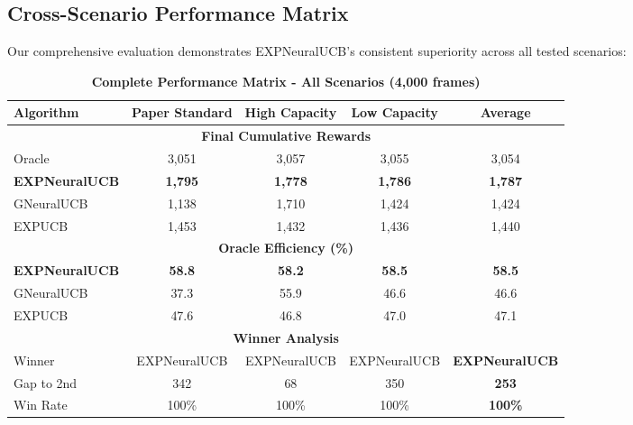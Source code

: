 \documentclass[11pt,a4paper]{article}
\newcommand{\performance}[1]{\textcolor{performancecolor}{\textbf{#1}}}
\newcommand{\success}[1]{\textcolor{successcolor}{\textbf{#1}}}
\begin{document}
\begin{tcolorbox}[colback=performancecolor!10,colframe=performancecolor,title=\textbf{Primary Performance Analysis}]

\subsection{Cross-Scenario Performance Matrix}

Our comprehensive evaluation demonstrates EXPNeuralUCB's consistent superiority across all tested scenarios:

\begin{table}[H]
\centering
\caption{\performance{Complete Performance Matrix - All Scenarios (4,000 frames)}}
\begin{tabular}{|l|c|c|c|c|}
\hline
\textbf{Algorithm} & \textbf{Paper Standard} & \textbf{High Capacity} & \textbf{Low Capacity} & \textbf{Average} \\
\hline
\hline
\multicolumn{5}{|c|}{\textbf{Final Cumulative Rewards}} \\
\hline
Oracle & 3,051 & 3,057 & 3,055 & 3,054 \\
\performance{EXPNeuralUCB} & \performance{\textbf{1,795}} & \performance{\textbf{1,778}} & \performance{\textbf{1,786}} & \performance{\textbf{1,787}} \\
GNeuralUCB & 1,138 & 1,710 & 1,424 & 1,424 \\
EXPUCB & 1,453 & 1,432 & 1,436 & 1,440 \\
\hline
\multicolumn{5}{|c|}{\textbf{Oracle Efficiency (\%)}} \\
\hline
\performance{EXPNeuralUCB} & \performance{58.8} & \performance{58.2} & \performance{58.5} & \performance{58.5} \\
GNeuralUCB & 37.3 & 55.9 & 46.6 & 46.6 \\
EXPUCB & 47.6 & 46.8 & 47.0 & 47.1 \\
\hline
\multicolumn{5}{|c|}{\textbf{Winner Analysis}} \\
\hline
Winner & EXPNeuralUCB & EXPNeuralUCB & EXPNeuralUCB & \performance{EXPNeuralUCB} \\
Gap to 2nd & 342 & 68 & 350 & \performance{253} \\
Win Rate & 100\% & 100\% & 100\% & \success{100\%} \\
\hline
\end{tabular}
\end{table}

\end{tcolorbox}
\end{document}
